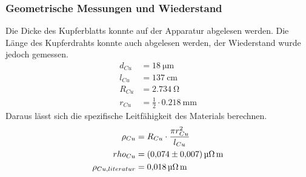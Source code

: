\subsubsection{Geometrische Messungen und Wiederstand}
Die Dicke des Kupferblatts konnte auf der Apparatur abgelesen werden.
Die Länge des Kupferdrahts konnte auch abgelesen werden, der Wiederstand wurde jedoch gemessen.
\begin{align*}
    d_{Cu} &= \SI{18}{\micro \meter} \\
    l_{Cu} &= \SI{137}{\centi \meter}\\
    R_{Cu} &= \SI{2,734}{\ohm}\\
    r_{Cu} &= \frac{1}{2}\cdot \SI{0,218}{\milli \meter}
\end{align*}
Daraus lässt sich die spezifische Leitfähigkeit des Materials berechnen.
\begin{align*}
    \rho_{Cu} &= R_{Cu}\cdot \frac{\pi r_{Cu}^2}{l_{Cu}}\\
    rho_{Cu} &= \SI{0,074\pm0,007}{\micro \ohm \meter}\\
    \rho_{Cu,literatur} &= \SI{0,018}{\micro \ohm \meter} %
\end{align*}
